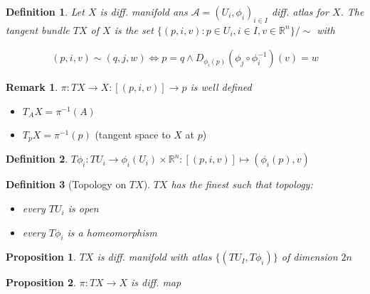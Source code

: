 \documentclass{scrartcl}
\newcommand{\R}{\mathbb R}
\newtheorem*{mydef}{Definition}
\newtheorem*{prop}{Proposition}
\newtheorem*{remark}{Remark}
\begin{document}
\begin{mydef}
  Let $X$ is diff. manifold ans $\mathcal A={(U_i,\phi_i)}_{i\in I}$ diff. atlas for $X$. The \emph{tangent bundle} $TX$ of $X$ is the set $\{(p,i,v):p\in U_i, i\in I, v \in \R^n\}/{\sim}$ with

  \begin{align}
    (p,i,v)\sim(q,j,w)\Leftrightarrow p=q \land D_{\phi_i(p)}(\phi_j\circ \phi_i^{-1})(v)=w
  \end{align}
\end{mydef}

\begin{remark}
  $\pi: TX \rightarrow X : [(p,i,v)]\rightarrow p$ is well defined
\end{remark}

\begin{itemize}
\item $T_A X = \pi^{-1}(A)$
\item $T_p X=\pi^{-1}(p)$ (tangent space to $X$ at $p$)
\end{itemize}

\begin{mydef}
  $T\phi_i: TU_i \rightarrow \phi_i(U_i) \times \R^n : [(p,i,v)] \mapsto (\phi_i(p),v)$
\end{mydef}

\begin{mydef}[Topology on $TX$]
  $TX$ has the finest such that topology:

  \begin{itemize}
  \item every $TU_i$ is open
  \item every $T\phi_i$ is a homeomorphism
  \end{itemize}
\end{mydef}

\begin{prop}
  $TX$ is diff. manifold with atlas $\{(TU_I, T\phi_i)\}$ of dimension $2n$
\end{prop}

\begin{prop}
  $\pi:TX\rightarrow X$ is diff. map
\end{prop}
\end{document}
